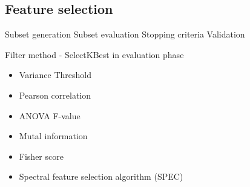 \subsection{Feature selection}
Subset generation %
Subset evaluation
Stopping criteria
Validation

\cite{nandi_condition_2019} %
Filter method - SelectKBest  in evaluation phase
\begin{itemize}
\item Variance Threshold
\item Pearson correlation
\item ANOVA F-value
\item Mutal information
\item Fisher score
\item Spectral feature selection algorithm (SPEC)
\end{itemize}
